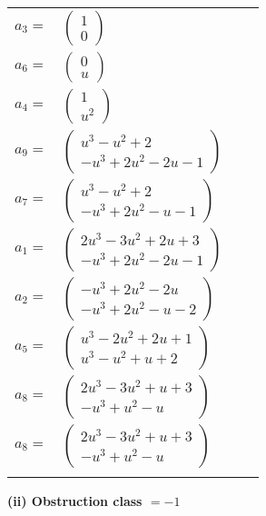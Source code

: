 \documentclass[1p]{elsarticle_modified}
\theoremstyle{definition}
\begin{document}
\begin{tabular}{m{7pt} m{180pt} m{7pt} m{180pt} }
\flushright $a_{3}=$&$\begin{pmatrix}1\\0\end{pmatrix}$ \\
\flushright $a_{6}=$&$\begin{pmatrix}0\\u\end{pmatrix}$ \\
\flushright $a_{4}=$&$\begin{pmatrix}1\\u^2\end{pmatrix}$ \\
\flushright $a_{9}=$&$\begin{pmatrix}u^3- u^2+2\\- u^3+2 u^2-2 u-1\end{pmatrix}$ \\
\flushright $a_{7}=$&$\begin{pmatrix}u^3- u^2+2\\- u^3+2 u^2- u-1\end{pmatrix}$ \\
\flushright $a_{1}=$&$\begin{pmatrix}2 u^3-3 u^2+2 u+3\\- u^3+2 u^2-2 u-1\end{pmatrix}$ \\
\flushright $a_{2}=$&$\begin{pmatrix}- u^3+2 u^2-2 u\\- u^3+2 u^2- u-2\end{pmatrix}$ \\
\flushright $a_{5}=$&$\begin{pmatrix}u^3-2 u^2+2 u+1\\u^3- u^2+u+2\end{pmatrix}$ \\
\flushright $a_{8}=$&$\begin{pmatrix}2 u^3-3 u^2+u+3\\- u^3+u^2- u\end{pmatrix}$\\ \flushright $a_{8}=$&$\begin{pmatrix}2 u^3-3 u^2+u+3\\- u^3+u^2- u\end{pmatrix}$\\&\end{tabular}
\flushleft \textbf{(ii) Obstruction class $= -1$}\\~\\
\end{document}
